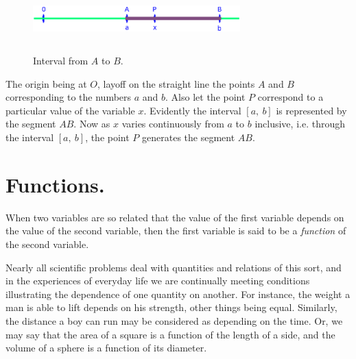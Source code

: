 \begin{figure}[h]
\begin{minipage}{\textwidth}
\begin{center}
\includegraphics[height=2.5cm,width=8cm]{line-segment.eps}
\end{center}
\end{minipage}
\caption{Interval from $A$ to $B$.}
\label{fig:AB}
\end{figure}

\noindent
The origin being at $O$, layoff on the straight line the points 
$A$ and $B$ corresponding to the numbers $a$ and $b$. Also 
let the point $P$ correspond to a particular value of the variable $x$. 
Evidently the interval $\left \lbrack a,\ b \right \rbrack$ is 
represented by the segment $AB$. Now as $x$ varies continuously 
from $a$ to $b$ inclusive, i.e. through the interval 
$\left \lbrack a,\ b \right \rbrack$, the point $P$ 
generates the segment $AB$.


\section{Functions.} When two variables are so related that the 
value of the first variable depends on the value of the second 
variable, then the first variable is said to be a {\it function} of 
the second variable.

Nearly all scientific problems deal with quantities and relations 
of this sort, and in the experiences of everyday life we are 
continually meeting conditions illustrating the dependence of 
one quantity on another. For instance, the weight a man is able 
to lift depends on his strength, other things being equal. 
Similarly, the distance a boy can run may be considered as 
depending on the time. Or, we may say that the area of a square 
is a function of the length of a side, and the volume of a 
sphere is a function of its diameter.

